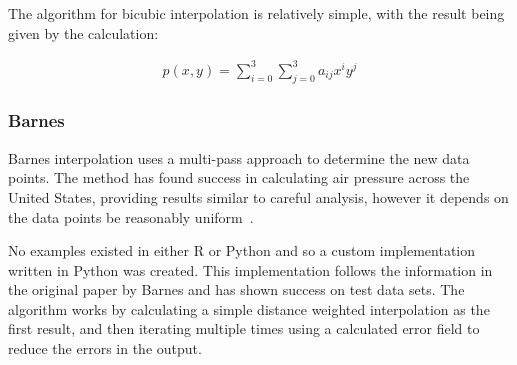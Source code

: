             The algorithm for bicubic interpolation is relatively simple, with the result being given by the calculation:

            \begin{align*}
                p(x,y) = \sum_{i=0}^{3}{\sum_{j=0}^{3}{a_{ij}x^{i}y^{j}}}
            \end{align*}

        
        


        \subsubsection{Barnes}\label{background_interpolation_methods_barnes}

            Barnes interpolation uses a multi-pass approach to determine the new data points. The method has found success in calculating air pressure across the United States, providing results similar to careful analysis, however it depends on the data points be reasonably uniform~\cite{barnesinterpolation}.

            No examples existed in either R or Python and so a custom implementation written in Python was created. This implementation follows the information in the original paper by Barnes and has shown success on test data sets. The algorithm works by calculating a simple distance weighted interpolation as the first result, and then iterating multiple times using a calculated error field to reduce the errors in the output. 

